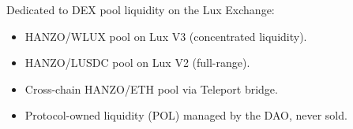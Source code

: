 Dedicated to DEX pool liquidity on the Lux Exchange:

\begin{itemize}[leftmargin=1.1em]
    \item HANZO/WLUX pool on Lux V3 (concentrated liquidity).
    \item HANZO/LUSDC pool on Lux V2 (full-range).
    \item Cross-chain HANZO/ETH pool via Teleport bridge.
    \item Protocol-owned liquidity (POL) managed by the DAO, never sold.
\end{itemize}

